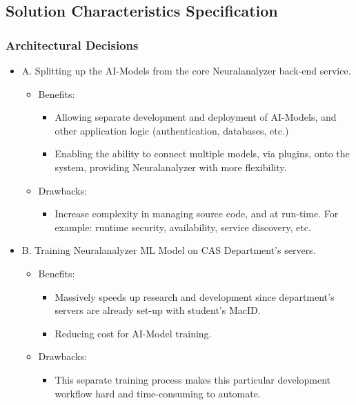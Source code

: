 \documentclass[12pt]{article}
\begin{document}
\subsection{Solution Characteristics Specification}
\subsubsection{Architectural Decisions}
\begin{itemize}
\item A. Splitting up the AI-Models from the core Neuralanalyzer back-end service.
    \begin{itemize}
        \item Benefits:
        \begin{itemize}
            \item Allowing separate development and deployment of AI-Models, and other application logic (authentication, databases, etc.)
            \item Enabling the ability to connect multiple models, via plugins, onto the system, providing Neuralanalyzer with more flexibility.
        \end{itemize}
        \item Drawbacks:
        \begin{itemize}
            \item Increase complexity in managing source code, and at run-time. For example: runtime security, availability, service discovery, etc.
        \end{itemize}
    \end{itemize}
    
\item B. Training Neuralanalyzer ML Model on CAS Department's servers.
    \begin{itemize}
        \item Benefits:
        \begin{itemize}
            \item Massively speeds up research and development since department's servers are already set-up with student's MacID.
            \item Reducing cost for AI-Model training.
        \end{itemize}
        \item Drawbacks:
        \begin{itemize}
            \item This separate training process makes this particular development workflow hard and time-consuming to automate.
        \end{itemize}
    \end{itemize}
    

\end{itemize}
\end{document}
